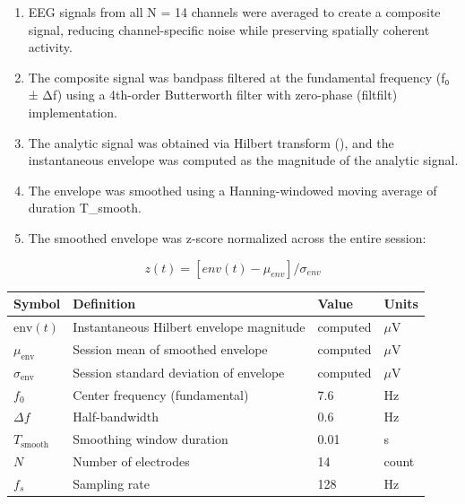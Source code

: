 \documentclass[11pt,a4paper]{article}
\begin{document}
\begin{enumerate}
\item EEG signals from all N = 14 channels were averaged to create a composite signal, reducing channel-specific noise while preserving spatially coherent activity.
\item The composite signal was bandpass filtered at the fundamental frequency (f₀ ± Δf) using a 4th-order Butterworth filter with zero-phase (filtfilt) implementation.
\item The analytic signal was obtained via Hilbert transform (\cite{gabor1946theory}), and the instantaneous envelope was computed as the magnitude of the analytic signal.
\item The envelope was smoothed using a Hanning-windowed moving average of duration T\_smooth.
\item The smoothed envelope was z-score normalized across the entire session:
\end{enumerate}
\begin{displaymath}
z(t) = [env(t) - μ_{env}] / σ_{env}
\end{displaymath}
\begin{table}[h]
    \centering
    \begin{tabular}{llll}
        \toprule
        Symbol & Definition & Value & Units \\
        \midrule
        $\mathrm{env}(t)$ & Instantaneous Hilbert envelope magnitude & computed & $\mu$V \\
        $\mu_{\mathrm{env}}$ & Session mean of smoothed envelope & computed & $\mu$V \\
        $\sigma_{\mathrm{env}}$ & Session standard deviation of envelope & computed & $\mu$V \\
        $f_{0}$ & Center frequency (fundamental) & 7.6 & Hz \\
        $\Delta f$ & Half-bandwidth & 0.6 & Hz \\
        $T_{\mathrm{smooth}}$ & Smoothing window duration & 0.01 & s \\
        $N$ & Number of electrodes & 14 & count \\
        $f_{s}$ & Sampling rate & 128 & Hz \\
        \bottomrule
    \end{tabular}
\end{table}
\end{document}
